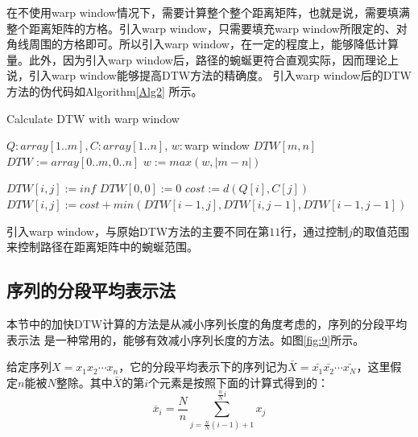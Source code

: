在不使用warp window情况下，需要计算整个整个距离矩阵，也就是说，需要填满整个距离矩阵的方格。引入warp window，只需要填充warp window所限定的、对角线周围的方格即可。所以引入warp window，在一定的程度上，能够降低计算量。此外，因为引入warp window后，路径的蜿蜒更符合直观实际，因而理论上说，引入warp window能够提高DTW方法的精确度。
引入warp window后的DTW方法的伪代码如Algorithm\ref{Alg2} 所示。

\begin{algorithm}[h]
\caption{Calculate DTW with warp window}
\begin{algorithmic}[1]
\small
\REQUIRE $Q:array[1..m], C:array[1..n]$, $w:$warp window
\ENSURE $DTW[m,n]$
\STATE $DTW := array[0..m,0..n]$
\STATE $w := max(w,\left| {m-n} \right|)$

\STATE $DTW[i,j] := inf$
\ENDFOR
\ENDFOR
\STATE $DTW[0,0] := 0$
\STATE
{}
\STATE $cost := d(Q[i],C[j])$
\STATE $DTW[i,j]:=cost+min(DTW[i-1,j],DTW[i,j-1],DTW[i-1,j-1])$
\ENDFOR
\ENDFOR
\end{algorithmic}
\label{Alg2}
\end{algorithm}

引入warp window，与原始DTW方法的主要不同在第$11$行，通过控制$j$的取值范围来控制路径在距离矩阵中的蜿蜒范围。

\subsection{序列的分段平均表示法}
本节中的加快DTW计算的方法是从减小序列长度的角度考虑的，序列的分段平均表示法\cite{Keogh2000} 是一种常用的，能够有效减小序列长度的方法。如图\ref{fig:9}所示。

给定序列$X = x_1 x_2 \cdots x_n$，它的分段平均表示下的序列记为$\bar{X} = \bar{x_1} \bar{x_2} \cdots \bar{x_N}$，这里假定$n$能被$N$整除。其中$\bar{X}$的第$i$个元素是按照下面的计算式得到的：
\begin{equation}\label{equ:8}
  {\overline x _i} = \frac{N}{n}\sum\limits_{j = \frac{n}{N}\left( {i - 1} \right) + 1}^{\frac{n}{N}i} {{x_j}}
\end{equation}


